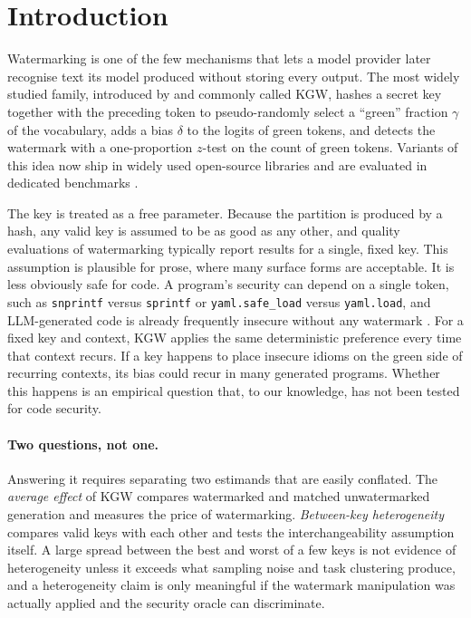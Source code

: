 \section{Introduction}
\label{sec:intro}

Watermarking is one of the few mechanisms that lets a model provider later recognise text its model produced without storing every output. The most widely studied family, introduced by \citet{kirchenbauer2023watermark} and commonly called KGW, hashes a secret key together with the preceding token to pseudo-randomly select a ``green'' fraction $\gamma$ of the vocabulary, adds a bias $\delta$ to the logits of green tokens, and detects the watermark with a one-proportion $z$-test on the count of green tokens. Variants of this idea now ship in widely used open-source libraries \citep{wolf2020transformers,pan2024markllm} and are evaluated in dedicated benchmarks \citep{tu2024waterbench,piet2023markmywords}.

The key is treated as a free parameter. Because the partition is produced by a hash, any valid key is assumed to be as good as any other, and quality evaluations of watermarking typically report results for a single, fixed key. This assumption is plausible for prose, where many surface forms are acceptable. It is less obviously safe for code. A program's security can depend on a single token, such as \texttt{snprintf} versus \texttt{sprintf} or \texttt{yaml.safe\_load} versus \texttt{yaml.load}, and LLM-generated code is already frequently insecure without any watermark \citep{pearce2022asleep,bhatt2023cyberseceval,peng2025cweval}. For a fixed key and context, KGW applies the same deterministic preference every time that context recurs. If a key happens to place insecure idioms on the green side of recurring contexts, its bias could recur in many generated programs. Whether this happens is an empirical question that, to our knowledge, has not been tested for code security.

\paragraph{Two questions, not one.} Answering it requires separating two estimands that are easily conflated. The \emph{average effect} of KGW compares watermarked and matched unwatermarked generation and measures the price of watermarking. \emph{Between-key heterogeneity} compares valid keys with each other and tests the interchangeability assumption itself. A large spread between the best and worst of a few keys is not evidence of heterogeneity unless it exceeds what sampling noise and task clustering produce, and a heterogeneity claim is only meaningful if the watermark manipulation was actually applied and the security oracle can discriminate.

